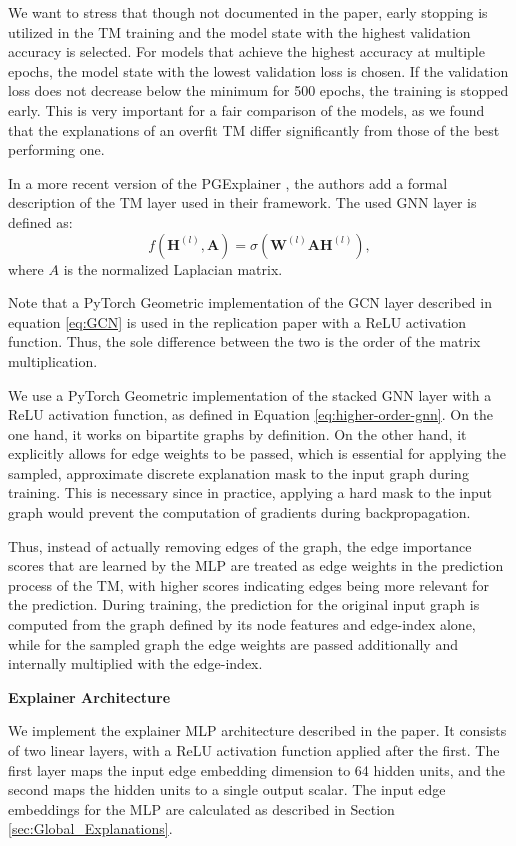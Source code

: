 We want to stress that though not documented in the paper, early stopping is utilized in the \ac{TM} training and the model state with the highest validation accuracy is selected. For models that achieve the highest accuracy at multiple epochs, the model state with the lowest validation loss is chosen. If the validation loss does not decrease below the minimum for 500 epochs, the training is stopped early. This is very important for a fair comparison of the models, as we found that the explanations of an overfit \ac{TM} differ significantly from those of the best performing one.\bigskip

In a more recent version of the PGExplainer \cite{10423141}, the authors add a formal description of the \ac{TM} layer used in their framework. The used GNN layer is defined as:
\begin{equation}
    f(\mathbf{H}^{(l)},\mathbf{A})=\sigma(\mathbf{W}^{(l)}\mathbf{A}\mathbf{H}^{(l)}),
\end{equation}
where $A$ is the normalized Laplacian matrix.

Note that a PyTorch Geometric implementation of the GCN layer described in equation \ref{eq:GCN} is used in the replication paper \cite{holdijk2021re} with a ReLU activation function. Thus, the sole difference between the two is the order of the matrix multiplication. \bigskip

We use a PyTorch Geometric implementation of the stacked GNN layer with a ReLU activation function, as defined in Equation \ref{eq:higher-order-gnn}. On the one hand, it works on bipartite graphs by definition. On the other hand, it explicitly allows for edge weights to be passed, which is essential for applying the sampled, approximate discrete explanation mask to the input graph during training. This is necessary since in practice, applying a hard mask to the input graph would prevent the computation of gradients during backpropagation.

Thus, instead of actually removing edges of the graph, the edge importance scores that are learned by the MLP are treated as edge weights in the prediction process of the \ac{TM}, with higher scores indicating edges being more relevant for the prediction. During training, the prediction for the original input graph is computed from the graph defined by its node features and edge-index alone, while for the sampled graph the edge weights are passed additionally and internally multiplied with the edge-index.\bigskip

\textbf{Explainer Architecture}\par
We implement the explainer MLP architecture described in the paper. It consists of two linear layers, with a ReLU activation function applied after the first. The first layer maps the input edge embedding dimension to 64 hidden units, and the second maps the hidden units to a single output scalar. The input edge embeddings for the MLP are calculated as described in Section \ref{sec:Global_Explanations}. 

